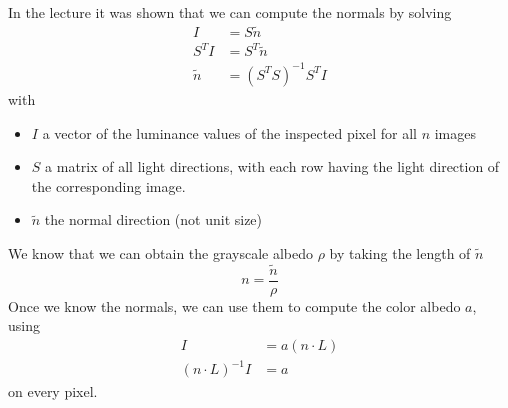 \documentclass{paper}
\begin{document}
In the lecture it was shown that we can compute the normals by solving
\begin{align*}
	 I &= S\tilde{n} \\
	 S^TI &= S^T\tilde{n} \\
	 \tilde{n} &= (S^TS)^{-1}S^TI
\end{align*}
with 
\begin{itemize}
	\item $I$ a vector of the luminance values of the 
	inspected pixel for all $n$ images
	\item $S$ a matrix of all light directions, with each row
	having the light direction of the corresponding image.
	\item $\tilde{n}$ the normal direction (not unit size)
\end{itemize}
We know that we can obtain the grayscale albedo $\rho$ by taking the length of $\tilde{n}$
\begin{equation}
	n = \frac{\tilde{n}}{\rho}
\end{equation}
Once we know the normals, we can use them to compute the color albedo $a$, using
\begin{align*}
	I &= a(n \cdot L) \\
	(n \cdot L)^{-1} I &= a
\end{align*}
on every pixel.
\end{document}
